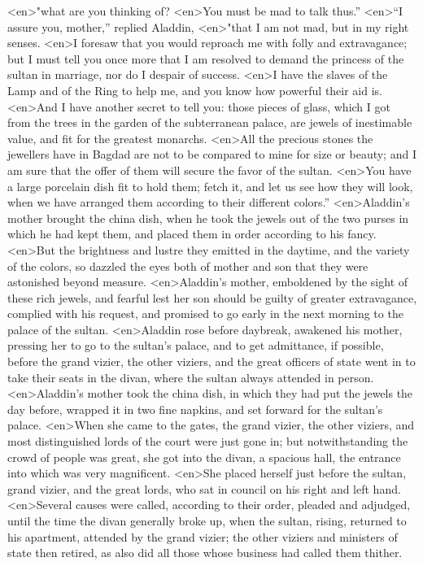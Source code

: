 <en>"what are you thinking of?
<en>You must be mad to talk thus.”
<en>“I assure you, mother,” replied Aladdin,
<en>"that I am not mad, but in my right senses.
<en>I foresaw that you would reproach me with folly and extravagance; but I must tell you once more that I am resolved to demand the princess of the sultan in marriage, nor do I despair of success.
<en>I have the slaves of the Lamp and of the Ring to help me, and you know how powerful their aid is.
<en>And I have another secret to tell you: those pieces of glass, which I got from the trees in the garden of the subterranean palace, are jewels of inestimable value, and fit for the greatest monarchs.
<en>All the precious stones the jewellers have in Bagdad are not to be compared to mine for size or beauty; and I am sure that the offer of them will secure the favor of the sultan.
<en>You have a large porcelain dish fit to hold them; fetch it, and let us see how they will look, when we have arranged them according to their different colors.”
<en>Aladdin’s mother brought the china dish, when he took the jewels out of the two purses in which he had kept them, and placed them in order according to his fancy.
<en>But the brightness and lustre they emitted in the daytime, and the variety of the colors, so dazzled the eyes both of mother and son that they were astonished beyond measure.
<en>Aladdin’s mother, emboldened by the sight of these rich jewels, and fearful lest her son should be guilty of greater extravagance, complied with his request, and promised to go early in the next morning to the palace of the sultan.
<en>Aladdin rose before daybreak, awakened his mother, pressing her to go to the sultan’s palace, and to get admittance, if possible, before the grand vizier, the other viziers, and the great officers of state went in to take their seats in the divan, where the sultan always attended in person.
<en>Aladdin’s mother took the china dish, in which they had put the jewels the day before, wrapped it in two fine napkins, and set forward for the sultan’s palace.
<en>When she came to the gates, the grand vizier, the other viziers, and most distinguished lords of the court were just gone in; but notwithstanding the crowd of people was great, she got into the divan, a spacious hall, the entrance into which was very magnificent.
<en>She placed herself just before the sultan, grand vizier, and the great lords, who sat in council on his right and left hand.
<en>Several causes were called, according to their order, pleaded and adjudged, until the time the divan generally broke up, when the sultan, rising, returned to his apartment, attended by the grand vizier; the other viziers and ministers of state then retired, as also did all those whose business had called them thither.

